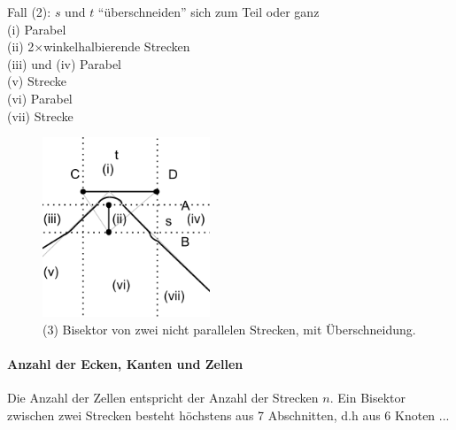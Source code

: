 Fall (2): $s$ und $t$ "`überschneiden"' sich zum Teil oder ganz\\
(i) Parabel\\
(ii) 2$\times$winkelhalbierende Strecken\\
(iii) und (iv) Parabel\\
(v) Strecke\\
(vi) Parabel\\
(vii) Strecke\\

\begin{figure}[h!]
\begin{center}
\includegraphics[width=5cm]{img/ssnpin.png}
\end{center}
\caption{(3) Bisektor von zwei nicht parallelen Strecken, mit Überschneidung.}
\label{fig:ssnpu}
\end{figure}

\paragraph*{Anzahl der Ecken, Kanten und Zellen} Die Anzahl der Zellen entspricht der Anzahl der Strecken $n$. Ein Bisektor zwischen zwei Strecken besteht höchstens aus 7 Abschnitten, d.h aus 6 Knoten ...